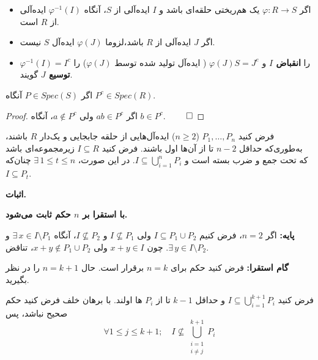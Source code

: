 \begin{frame}
    \begin{remark}

        \begin{itemize}
            \item اگر $\varphi: R \to S$ یک هم‌ریختی حلقه‌ای باشد و $I$ ایده‌آلی از $S$، آنگاه $\varphi^{-1}(I)$ ایده‌آلی از $R$ است.
            \item اگر $J$ ایده‌آلی از $R$ باشد،لزوما \(\varphi(J)\) ایده‌آل  \(S\) نیست.
            \item $\varphi^{-1}(I) = I^c$ را \textbf{انقباض   $I$} و $\varphi(J)S = J^e$ ({ ایده‌آل تولید شده توسط \(\varphi(J)\)}) را \textbf{ توسیع   $J$} گویند.
        \end{itemize}

    \end{remark}



    \begin{theorem}
        اگر $P \in Spec(S)$ آنگاه $P^c \in Spec(R)$.
    \end{theorem}

    \begin{proof}
        اگر $ab \in P^c$ ولی $a \notin P^c$، آنگاه $b \in P^c$.
        \(\qed\)
    \end{proof}

\end{frame}

\begin{frame}
    \begin{theorem}
        فرض کنید $P_1, \dots, P_n$ (\(n \geq 2\)) ایده‌آل‌هایی از حلقه جابجایی و یک‌دار $R$ باشند، به‌طوری‌که حداقل $n-2$ تا از آن‌ها اول باشند. فرض کنید $I \subseteq R$ زیرمجموعه‌ای باشد که تحت جمع و ضرب بسته است و $I \subseteq \bigcup_{i=1}^n P_i$. در این صورت، $\exists\, 1 \le t \le n$ چنان‌که $I \subseteq P_t$.

    \end{theorem}


    \textbf{اثبات.}

    \textbf{ با استقرا بر $n$ حکم ثابت می‌شود.}

    \textbf{پایه:} اگر $n = 2$، فرض کنیم $I \subseteq P_1 \cup P_2$ ولی $I \not\subseteq P_1$ و $I \not\subseteq P_2$، آنگاه $\exists\, x \in I \setminus P_1$ و $\exists\, y \in I \setminus P_2$. چون $x+y \in I$ ولی $x+y \notin P_1 \cup P_2$، تناقض.

    \textbf{گام استقرا:} فرض کنید حکم برای $n = k$ برقرار است.
    حال $n = k+1$ را در نظر بگیرید.

    فرض کنید $I \subseteq \bigcup_{i=1}^{k+1} P_i$
    و حداقل
    \(k-1\)
    تا از
    \(P_i\)
    ها اولند.
    با برهان خلف فرض کنید حکم صحیح نباشد، پس
    \[
        \forall 1 \le j \le k+1; \quad I \not\subseteq \bigcup_{\substack{i=1\\i \ne j}}^{k+1} P_i
    \]
\end{frame}

